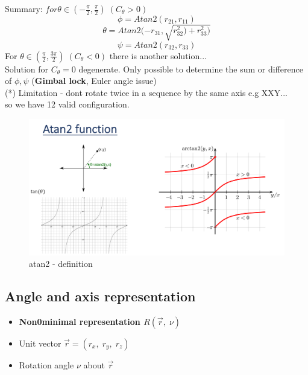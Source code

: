 \documentclass{article}
\begin{document}
\begin{enumerate}
     Summary:
     $for \theta \in (-\frac{\pi}{2}, \frac{\pi}{2})\; (C_{\theta}>0)$  
     $$ \phi = Atan2(r_{21}, r_{11})$$
     $$ \theta = Atan2(-r_{31}, \sqrt{r^{2}_{32}) + r^{2}_{33}) } $$
     $$ \psi = Atan2(r_{32}, r_{33})$$
     For $\theta \in (\frac{\pi}{2}, \frac{3\pi}{2})\; (C_{\theta}<0)$  there is another solution... \\
    Solution for $C_\theta = 0$ degenerate. Only possible to determine the sum or difference of $\phi, \psi$ (\textbf{Gimbal lock}, Euler angle issue)
 \\
 (*) Limitation - dont rotate twice in a sequence by the same axis e.g XXY...\\
 so we have 12 valid configuration.
    
    \begin{figure}[h!]
    \includegraphics[scale=1.3]{atan2.png}
    \caption{atan2 - definition}
    \label{fig:sr}
    \end{figure}
    \end{enumerate}

 

\newpage
\subsection{Angle and axis representation} 
\begin{itemize}
    \item \textbf{Non0minimal representation $R(\vec{r},\; \nu )$}
    \item Unit vector $\vec{r} = (r_{x}, \; r_{y}, \; r_{z} )$
    \item Rotation angle $ \nu $ about $ \vec{r} $
\end{itemize}
\end{document}
